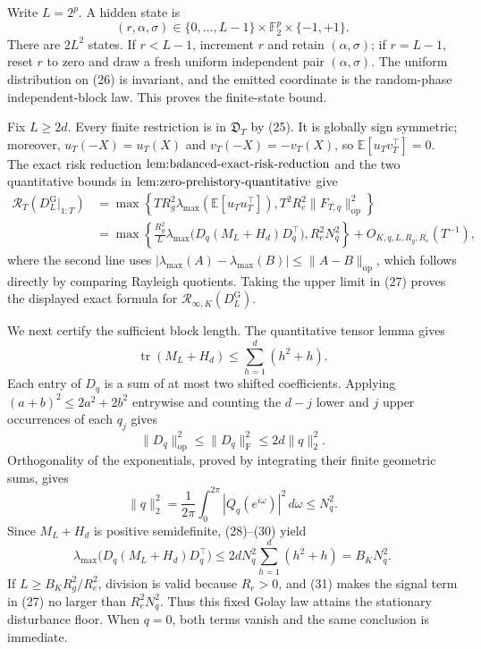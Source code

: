 Write \(L=2^p\).  A hidden state is
\[
(r,\alpha,\sigma)\in\{0,\ldots,L-1\}\times\mathbb F_2^p\times\{-1,+1\}. \tag{26}
\]
There are \(2L^2\) states.  If \(r<L-1\), increment \(r\) and retain \((\alpha,\sigma)\); if \(r=L-1\), reset \(r\) to zero and draw a fresh uniform independent pair \((\alpha,\sigma)\).  The uniform distribution on (26) is invariant, and the emitted coordinate is the random-phase independent-block law.  This proves the finite-state bound.

Fix \(L\ge2d\).  Every finite restriction is in \(\mathfrak D_T\) by (25).  It is globally sign symmetric; moreover, \(u_T(-X)=u_T(X)\) and \(v_T(-X)=-v_T(X)\), so \(\mathbb E[u_Tv_T^{\top}]=0\).  The exact risk reduction \(\textnormal{lem:balanced-exact-risk-reduction}\) and the two quantitative bounds in \(\textnormal{lem:zero-prehistory-quantitative}\) give
\[
\begin{aligned}
\mathcal R_T(D_L^{\mathrm G}|_{1:T})
&=\max\!\left\{T R_g^2\lambda_{\max}(\mathbb E[u_Tu_T^{\top}]),
T^2R_e^2\|F_{T,q}\|_{\mathrm{op}}^2\right\}\\
&=\max\!\left\{
\frac{R_g^2}{L}\lambda_{\max}\!\bigl(D_q(M_L+H_d)D_q^{\top}\bigr),
R_e^2N_q^2\right\}+O_{K,q,L,R_g,R_e}(T^{-1}), \tag{27}
\end{aligned}
\]
where the second line uses \(|\lambda_{\max}(A)-\lambda_{\max}(B)|\le\|A-B\|_{\mathrm{op}}\), which follows directly by comparing Rayleigh quotients.  Taking the upper limit in (27) proves the displayed exact formula for \(\mathcal R_{\infty,K}(D_L^{\mathrm G})\).

We next certify the sufficient block length.  The quantitative tensor lemma gives
\[
\operatorname{tr}(M_L+H_d)\le\sum_{h=1}^d(h^2+h). \tag{28}
\]
Each entry of \(D_q\) is a sum of at most two shifted coefficients.  Applying \((a+b)^2\le2a^2+2b^2\) entrywise and counting the \(d-j\) lower and \(j\) upper occurrences of each \(q_j\) gives
\[
\|D_q\|_{\mathrm{op}}^2\le\|D_q\|_{\mathrm F}^2
\le2d\|q\|_2^2. \tag{29}
\]
Orthogonality of the exponentials, proved by integrating their finite geometric sums, gives
\[
\|q\|_2^2=\frac1{2\pi}\int_0^{2\pi}|Q_q(e^{i\omega})|^2\,d\omega\le N_q^2. \tag{30}
\]
Since \(M_L+H_d\) is positive semidefinite, (28)--(30) yield
\[
\lambda_{\max}\!\bigl(D_q(M_L+H_d)D_q^{\top}\bigr)
\le2dN_q^2\sum_{h=1}^d(h^2+h)=B_KN_q^2. \tag{31}
\]
If \(L\ge B_KR_g^2/R_e^2\), division is valid because \(R_e>0\), and (31) makes the signal term in (27) no larger than \(R_e^2N_q^2\).  Thus this fixed Golay law attains the stationary disturbance floor.  When \(q=0\), both terms vanish and the same conclusion is immediate.

